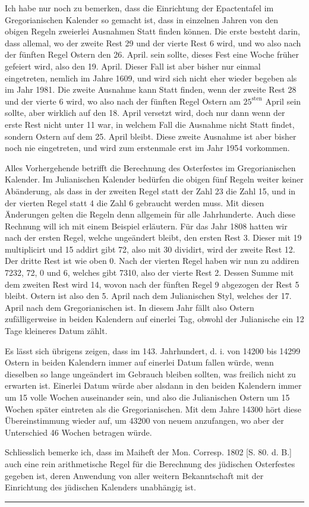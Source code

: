Ich habe nur noch zu bemerken, dass die Einrichtung der Epactentafel im
Gregorianischen Kalender so gemacht ist, dass in einzelnen Jahren von den obigen
Regeln zweierlei Ausnahmen Statt finden können. Die erste besteht darin,
dass allemal, wo der zweite Rest 29 und der vierte Rest 6 wird, und wo also
nach der fünften Regel Ostern den 26. April. sein sollte, dieses Fest eine Woche
früher gefeiert wird, also den 19. April. Dieser Fall ist aber bisher nur einmal
eingetreten, nemlich im Jahre 1609, und wird sich nicht eher wieder begeben
als im Jahr 1981. Die zweite Ausnahme kann Statt finden, wenn der zweite
Rest 28 und der vierte 6 wird, wo also nach der fünften Regel Ostern am $25^{\mathrm{sten}}$
April sein sollte, aber wirklich auf den 18. April versetzt wird, doch nur dann
wenn der erste Rest nicht unter 11 war, in welchem Fall die Ausnahme nicht
Statt findet, sondern Ostern auf dem 25. April bleibt. Diese zweite Ausnahme
ist aber bisher noch nie eingetreten, und wird zum erstenmale erst im Jahr 1954
vorkommen.

Alles Vorhergehende betrifft die Berechnung des Osterfestes im Gregorianischen
Kalender. Im Julianischen Kalender bedürfen die obigen fünf Regeln
weiter keiner Abänderung, als dass in der zweiten Regel statt der Zahl 23 die
Zahl 15, und in der vierten Regel statt 4 die Zahl 6 gebraucht werden muss.
Mit diesen Änderungen gelten die Regeln denn allgemein für alle Jahrhunderte.
Auch diese Rechnung will ich mit einem Beispiel erläutern. Für das Jahr 1808
hatten wir nach der ersten Regel, welche ungeändert bleibt, den ersten Rest 3.
Dieser mit 19 multiplicirt und 15 addirt gibt 72, also mit 30 dividirt, wird
%
der zweite Rest 12. Der dritte Rest ist wie oben 0. Nach der vierten Regel
haben wir nun zu addiren 7232, 72, 0 und 6, welches gibt 7310, also der vierte
Rest 2. Dessen Summe mit dem zweiten Rest wird 14, wovon nach der fünften
Regel 9 abgezogen der Rest 5 bleibt. Ostern ist also den 5. April nach dem
Julianischen Styl, welches der 17. April nach dem Gregorianischen ist. In diesem
Jahr fällt also Ostern zufälligerweise in beiden Kalendern auf einerlei Tag,
obwohl der Julianische ein 12 Tage kleineres Datum zählt.

Es lässt sich übrigens zeigen, dass im 143. Jahrhundert, d. i. von 14200
bis 14299 Ostern in beiden Kalendern immer auf einerlei Datum fallen würde,
wenn dieselben so lange ungeändert im Gebrauch bleiben sollten, was freilich
nicht zu erwarten ist. Einerlei Datum würde aber alsdann in den beiden Kalendern
immer um 15 volle Wochen auseinander sein, und also die Julianischen
Ostern um 15 Wochen später eintreten als die Gregorianischen. Mit dem Jahre
14300 hört diese Übereinstimmung wieder auf, um 43200 von neuem anzufangen,
wo aber der Unterschied 46 Wochen betragen würde.

Schliesslich bemerke ich, dass im Maiheft der Mon. Corresp. 1802 [S. 80.
d. B.] auch eine rein arithmetische Regel für die Berechnung des jüdischen Osterfestes
gegeben ist, deren Anwendung von aller weitern Bekanntschaft mit der
Einrichtung des jüdischen Kalenders unabhängig ist.

\begin{center}\rule{.25\linewidth}{.3pt}\end{center}
